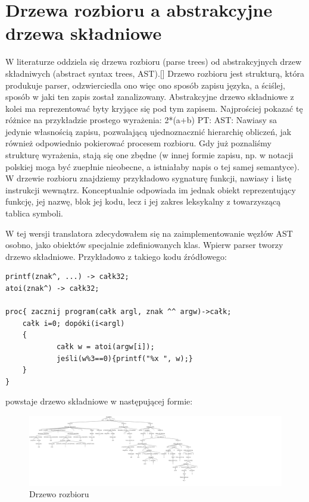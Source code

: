 \section{Drzewa rozbioru a abstrakcyjne drzewa składniowe}
W literaturze oddziela się drzewa rozbioru (parse trees) od abstrakcyjnych drzew składniwych (abstract syntax trees, AST).[] Drzewo rozbioru jest strukturą, która produkuje parser, odzwierciedla ono więc ono sposób zapisu języka, a ściślej, sposób w jaki ten zapis został zanalizowany. Abstrakcyjne drzewo składniowe z kolei ma reprezentować byty kryjące się pod tym zapisem. Najprościej pokazać tę różnice na przykładzie prostego wyrażenia:
2*(a+b)
PT:
AST:
Nawiasy sa jedynie własnością zapisu, pozwalającą ujednoznacznić hierarchię obliczeń, jak również odpowiednio pokierować procesem rozbioru. Gdy już poznaliśmy strukturę wyrażenia, stają się one zbędne (w innej formie zapisu, np. w notacji polskiej moga być zuepłnie nieobecne, a istniałaby napis o tej samej semantyce). W drzewie rozbioru znajdziemy przykładowo sygnaturę funkcji, nawiasy i listę instrukcji wewnątrz. Konceptualnie odpowiada im jednak obiekt reprezentujący funkcję, jej nazwę, blok jej kodu, lecz i jej zakres leksykalny z towarzyszącą tablica symboli.

W tej wersji translatora zdecydowałem się na zaimplementowanie węzłów AST osobno, jako obiektów specjalnie zdefiniowanych klas. Wpierw parser tworzy drzewo składniowe. Przykładowo z takiego kodu źródłowego:

\begin{lstlisting}
printf(znak^, ...) -> całk32;
atoi(znak^) -> całk32;

proc{ zacznij program(całk argl, znak ^^ argw)->całk;
	całk i=0; dopóki(i<argl)
	{
    		całk w = atoi(argw[i]);
    		jeśli(w%3==0){printf("%x ", w);}
	}
}
\end{lstlisting}
powstaje drzewo składniowe w następującej formie:
\begin{figure}[h]
    \centering
    \includegraphics[width=1.6\textwidth]{images/1.progmain/prezifelsePT1.png}
    \caption{Drzewo rozbioru}
\end{figure}

